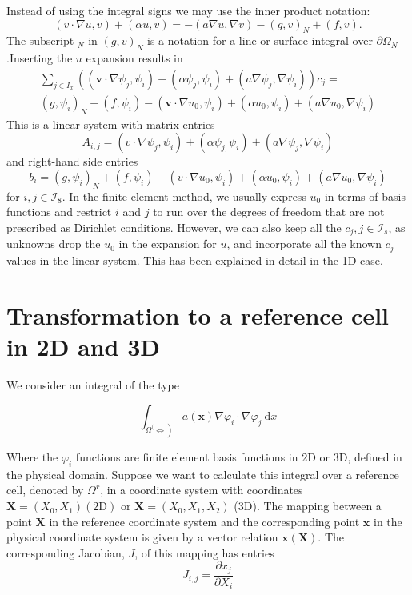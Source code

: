 \documentclass[../main.tex]{subfiles}
\begin{document}
	Instead of using the integral signs we may use the inner product notation:
	$$
	(v \cdot \nabla u, v)+(\alpha u, v)=-(a \nabla u, \nabla v)-(g, v)_{N}+(f, v) .
	$$
	The subscript $_{N}$ in $(g, v)_{N}$ is a notation for a line or surface integral over $\partial \Omega_{N}$.\smallbreak Inserting the $u$ expansion results in
	$$
	\begin{aligned}
		\sum_{j \in I_{x}}\left(\left(\boldsymbol{v} \cdot \nabla \psi_{j}, \psi_{i}\right)+\left(\alpha \psi_{j}, \psi_{i}\right)+\left(a \nabla \psi_{j}, \nabla \psi_{i}\right)\right) c_{j}=\\
		\left(g, \psi_{i}\right)_{N}+\left(f, \psi_{i}\right)-\left(\boldsymbol{v} \cdot \nabla u_{0}, \psi_{i}\right)+\left(\alpha u_{0}, \psi_{i}\right)+\left(a \nabla u_{0}, \nabla \psi_{i}\right)
	\end{aligned}
	$$
	This is a linear system with matrix entries
	$$
	A_{i, j}=\left(v \cdot \nabla \psi_{j}, \psi_{i}\right)+\left(\alpha \psi_{j,} \psi_{i}\right)+\left(a \nabla \psi_{j}, \nabla \psi_{i}\right)
	$$
	and right-hand side entries
	$$
	b_{i}=\left(g, \psi_{i}\right)_{N}+\left(f, \psi_{i}\right)-\left(v \cdot \nabla u_{0}, \psi_{i}\right)+\left(\alpha u_{0}, \psi_{i}\right)+\left(a \nabla u_{0}, \nabla \psi_{i}\right)
	$$
	for $i, j \in \mathcal{I}_{8}$.\smallbreak
	In the finite element method, we usually express $u_{0}$ in terms of basis functions and restrict $i$ and $j$ to run over the degrees of freedom that are not prescribed as Dirichlet conditions. However, we can also keep all the $c_{j}, j \in \mathcal{I}_{s}$, as unknowns drop the $u_{0}$ in the expansion for $u$, and incorporate all the known $c_{j}$ values in the linear system. This has been explained in detail in the 1D case.\bigbreak 
	
	\section[Transformation to a reference cell in 2D and 3D]{Transformation to a reference cell in 2D and 3D}
		\label{sec:sec_17_1}
	 
		\noindent We consider an integral of the type
		
		\begin{equation}
			\label{eqa201}
			\int_{\left.\Omega^{(} \Leftrightarrow\right)} a(\boldsymbol{x}) \nabla \varphi_{i} \cdot \nabla \varphi_{j} \mathrm{~d} x
		\end{equation}
	
		\noindent Where the $\varphi_{i}$ functions are finite element basis functions in $2 \mathrm{D}$ or $3 \mathrm{D}$, defined in the physical domain. Suppose we want to calculate this integral over a reference cell, denoted by $\Omega^{r}$, in a coordinate system with coordinates $\boldsymbol{X}=\left(X_{0}, X_{1}\right)(2 \mathrm{D})$ or $\boldsymbol{X}=\left(X_{0}, X_{1}, X_{2}\right)$ (3D). The mapping between a point $\boldsymbol{X}$ in the reference coordinate system and the corresponding point $\boldsymbol{x}$ in the physical coordinate system is given by a vector relation $\boldsymbol{x}(\boldsymbol{X})$. The corresponding Jacobian, $J$, of this mapping has entries
		$$
		J_{i, j}=\frac{\partial x_{j}}{\partial X_{i}}
		$$
		
\end{document}
